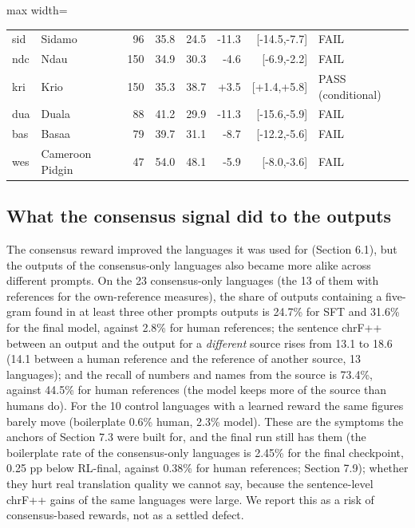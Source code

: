 \begin{table}[t]
\begin{adjustbox}{max width=\linewidth}
{\begin{tabular}{@{}llrrrrrl@{}}
sid & Sidamo & 96 & 35.8 & 24.5 & -11.3 & {[}-14.5,-7.7{]} & FAIL \\
ndc & Ndau & 150 & 34.9 & 30.3 & -4.6 & {[}-6.9,-2.2{]} & FAIL \\
kri & Krio & 150 & 35.3 & 38.7 & +3.5 & {[}+1.4,+5.8{]} & PASS (conditional) \\
dua & Duala & 88 & 41.2 & 29.9 & -11.3 & {[}-15.6,-5.9{]} & FAIL \\
bas & Basaa & 79 & 39.7 & 31.1 & -8.7 & {[}-12.2,-5.6{]} & FAIL \\
wes & Cameroon Pidgin & 47 & 54.0 & 48.1 & -5.9 & {[}-8.0,-3.6{]} & FAIL \\
\bottomrule
\end{tabular}
}
\end{adjustbox}
\end{table}

\subsection{What the consensus signal did to the outputs}\label{what-the-consensus-signal-did-to-the-outputs}

The consensus reward improved the languages it was used for (Section 6.1), but the outputs of the consensus-only languages also became more alike across different prompts. On the 23 consensus-only languages (the 13 of them with references for the own-reference measures), the share of outputs containing a five-gram found in at least three other prompts\textquotesingle{} outputs is 24.7\% for SFT and 31.6\% for the final model, against 2.8\% for human references; the sentence chrF++ between an output and the output for a \emph{different} source rises from 13.1 to 18.6 (14.1 between a human reference and the reference of another source, 13 languages); and the recall of numbers and names from the source is 73.4\%, against 44.5\% for human references (the model keeps more of the source than humans do). For the 10 control languages with a learned reward the same figures barely move (boilerplate 0.6\% human, 2.3\% model). These are the symptoms the anchors of Section 7.3 were built for, and the final run still has them (the boilerplate rate of the consensus-only languages is 2.45\% for the final checkpoint, 0.25 pp below RL-final, against 0.38\% for human references; Section 7.9); whether they hurt real translation quality we cannot say, because the sentence-level chrF++ gains of the same languages were large. We report this as a risk of consensus-based rewards, not as a settled defect.

